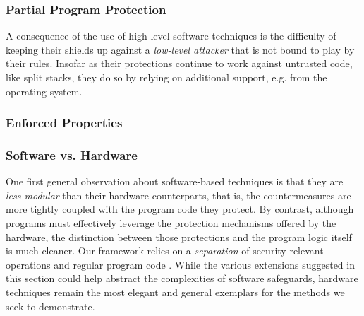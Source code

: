 \subsubsection{Partial Program Protection}
%
A consequence of the use of high-level software techniques is the difficulty of
keeping their shields up against a \emph{low-level attacker} that is not bound
to play by their rules.
%
Insofar as their protections continue to work against untrusted code, like split
stacks, they do so by relying on additional support, e.g. from the operating
system.
%
%

\subsubsection{Enforced Properties}
%

\subsubsection{Software vs. Hardware}
%
One first general observation about software-based techniques is that they
are \emph{less modular} than their hardware counterparts, that is, the
countermeasures are more tightly coupled with the program code they protect.
%
By contrast, although programs must effectively leverage the protection
mechanisms offered by the hardware, the distinction between those protections
and the program logic itself is much cleaner.
%
Our framework relies on a \emph{separation} of security-relevant operations and
regular program code .
%
While the various extensions suggested in this section could help abstract the
complexities of software safeguards, hardware techniques remain the most elegant
and general exemplars for the methods we seek to demonstrate.
%

